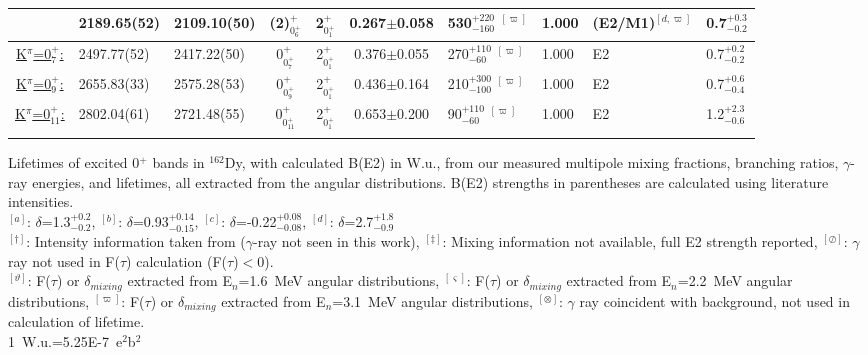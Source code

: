 \begin{landscape}
\begin{center}
\begin{longtable}{cllcccllll}
                                & 2189.65(52)  & 2109.10(50)                & (2)$^+_{0^+_{6}}$& 2$^+_{0^+_1}$ &0.267$\pm$0.058& 530$^{+220}_{-160}$ $^{[\varpi]}$   &1.000           &(E2/M1)$^{[d,\varpi]}$    & 0.7$^{+0.3}_{-0.2}$   \\  \hline
\underline{K$^\pi$=0$^+_7$:}    & 2497.77(52)  & 2417.22(50)                & 0$^+_{0^+_7}$    & 2$^+_{0^+_1}$ &0.376$\pm$0.055& 270$^{+110}_{-60}$ $^{[\varpi]}$    &1.000           & E2                & 0.7$^{+0.2}_{-0.2}$     \\ \hline
\underline{K$^\pi$=0$^+_9$:}    & 2655.83(33)  & 2575.28(53)                & 0$^+_{0^+_9}$    & 2$^+_{0^+_1}$ &0.436$\pm$0.164& 210$^{+300}_{-100}$ $^{[\varpi]}$   &1.000           & E2                & 0.7$^{+0.6}_{-0.4}$       \\ \hline
\underline{K$^\pi$=0$^+_{11}$:} & 2802.04(61)  & 2721.48(55)                & 0$^+_{0^+_{11}}$ & 2$^+_{0^+_1}$ &0.653$\pm$0.200& 90$^{+110}_{-60}$ $^{[\varpi]}$     &1.000           & E2                & 1.2$^{+2.3}_{-0.6}$      \\ \hline
 

\vspace{10pt}
\end{longtable}
\end{center}
Lifetimes of excited 0$^+$ bands in $^{162}$Dy, with calculated B(E2) in W.u., from our measured multipole mixing fractions, branching ratios, $\gamma$-ray energies, and lifetimes, all extracted from the angular distributions. B(E2) strengths in parentheses are calculated using literature intensities.\\
 $^{[a]}$: $\delta$=1.3$^{+0.2}_{-0.2}$,
 $^{[b]}$: $\delta$=0.93$^{+0.14}_{-0.15}$,
 $^{[c]}$: $\delta$=-0.22$^{+0.08}_{-0.08}$,
 $^{[d]}$: $\delta$=2.7$^{+1.8}_{-0.9}$\\
 $^{[\dagger]}$: Intensity information taken from \cite{Aprahamian200642,Zamfir_162Dy0_1999} ($\gamma$-ray not seen in this work),
 $^{[\ddagger]}$: Mixing information not available, full E2 strength reported,
 $^{[\oslash]}$: $\gamma$ ray not used in F($\tau$) calculation (F($\tau$)$<$0).\\
 $^{[\vartheta]}$: F($\tau$) or $\delta_{mixing}$ extracted from E$_n$=1.6~MeV angular distributions,
 $^{[\varsigma]}$: F($\tau$) or $\delta_{mixing}$ extracted from E$_n$=2.2~MeV angular distributions,
 $^{[\varpi]}$: F($\tau$) or $\delta_{mixing}$ extracted from E$_n$=3.1~MeV angular distributions,
 $^{[\otimes]}$: $\gamma$ ray coincident with background, not used in calculation of lifetime.\\
 1~W.u.=5.25E-7~e$^2$b$^2$
\end{landscape}

